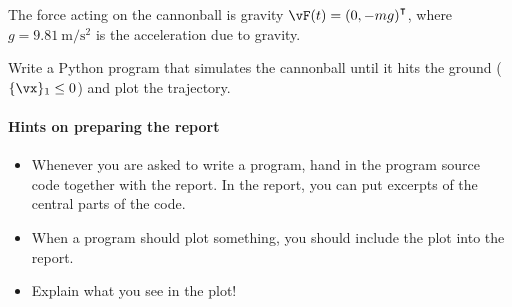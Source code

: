 The force acting on the cannonball is gravity $\vF(t) = \left(0,-m
g\right)^\intercal$, where $g=\SI{9.81}{\metre\per\second\squared}$ is the acceleration due
to gravity.

\begin{task}[3]
  Write a Python program that simulates the cannonball until it hits the ground
  ($\{\vx\}_1 \le 0$) and plot the trajectory.
\end{task}

\paragraph{Hints on preparing the report}
  \begin{itemize}
    \item Whenever you are asked to write a program, hand in the program source
      code together with the report. 
      In the report, you can put excerpts of the central parts of the code.
    \item When a program should plot something, you should include the plot
      into the report.
    \item Explain what you see in the plot!
  \end{itemize}

